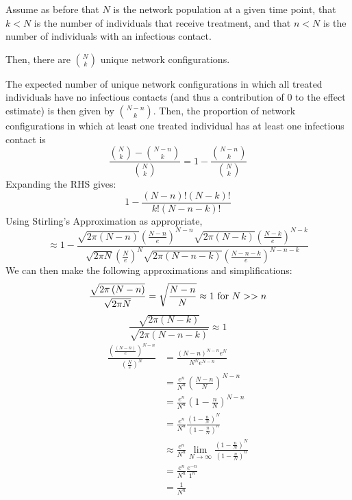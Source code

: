 \documentclass{article}
\theoremstyle{definition}
\begin{document}
Assume as before that $N$ is the network population at a given time point, that $k<N$ is the number of individuals that receive treatment, and that $n<N$ is the number of individuals with an infectious contact.

 Then, there are $N \choose k$ unique network configurations.
 
The expected number of unique network configurations in which all treated individuals have no infectious contacts (and thus a contribution of 0 to the effect estimate) is then given by $N-n\choose k$. Then, the proportion of network configurations in which at least one treated individual has at least one infectious contact is 
\begin{equation} 
\frac{{N \choose k}-{N-n \choose k}}{{N \choose k}}=1-\frac{{N-n \choose k}}{{N \choose k}}    
\end{equation}
Expanding the RHS gives:
\begin{equation}
1-\frac{\left(N-n\right)!\left(N-k\right)!}{k!\left(N-n-k\right)!}
\end{equation}
Using Stirling's Approximation as appropriate,
\begin{equation}
\approx 1-\frac{\sqrt{2\pi\left(N-n\right)}\left(\frac{N-n}{e}\right)^{N-n}\sqrt{2\pi\left(N-k\right)}\left(\frac{N-k}{e}\right)^{N-k}}{\sqrt{2\pi N}\left(\frac{N}{e}\right)^{N}\sqrt{2\pi \left(N-n-k\right)}\left(\frac{N-n-k}{e}\right)^{N-n-k}}    
\end{equation}
We can then make the following approximations and simplifications:
\begin{equation}
    \frac{\sqrt{2\pi \left(N-n\right)}}{\sqrt{2\pi N}}=\sqrt{\frac{N-n}{N}}\approx 1 \text{ for } N>>n\\
    \end{equation}
    \begin{equation}
    \frac{\sqrt{2 \pi \left(N-k\right)}}{\sqrt{2 \pi \left(N-n-k\right)}}\approx 1
\end{equation}
    \begin{align}
    \frac{\left(\frac{\left(N-n\right)}{e}\right)^{N-n}}{{\left(\frac{N}{e}\right)^{N}}}&=\frac{\left(N-n\right)^{N-n}e^{N}}{N^{N}e^{N-n}}\\
     &=\frac{e^{n}}{N^{n}}\left(\frac{N-n}{N}\right)^{N-n}\\
     &=\frac{e^{n}}{N^{n}}\left(1-\frac{n}{N}\right)^{N-n}\\
     &=\frac{e^{n}}{N^{n}}\frac{\left(1-\frac{n}{N}\right)^{N}}{\left(1-\frac{n}{N}\right)^{n}}\\
     &\approx \frac{e^{n}}{N^{n}}\lim_{N \to \infty}\frac{\left(1-\frac{n}{N}\right)^{N}}{\left(1-\frac{n}{N}\right)^{n}}\\
     &=\frac{e^{n}}{N^{n}}\frac{e^{-n}}{1^{n}}\\
     &=\frac{1}{N^{n}}
\end{align}
\end{document}
